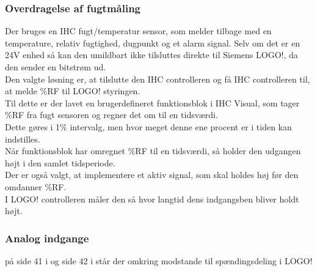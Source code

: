 \subsubsection{Overdragelse af fugtmåling}
Der bruges en IHC fugt/temperatur sensor, som melder tilbage med en temperature, relativ fugtighed, dugpunkt og et alarm signal.
Selv om det er en 24V enhed så kan den umildbart ikke tilsluttes direkte til Siemens LOGO!, da den sender en bitstrøm ud.\\
Den valgte løsning er, at tilslutte den IHC controlleren og få IHC controlleren til, at melde \%RF til LOGO! styringen. \\

Til dette er der lavet en brugerdefineret funktionsblok i IHC Visual, 
som tager \%RF fra fugt sensoren og regner det om til en tidsværdi. \\ 
Dette gøres i 1\% intervalg, men hvor meget denne ene procent er i tiden kan indstilles. \\
Når funktionsblok har omregnet \%RF til en tidsværdi, så holder den udgangen højt i den samlet tidsperiode. \\
Der er også valgt, at implementere et aktiv signal, som skal holdes høj før den omdanner \%RF.\\

I LOGO! controlleren måler den så hvor langtid dens indgangsben bliver holdt højt.



\subsubsection{Analog indgange}
på side 41 i \cite{logo_sm} og side 42 i \cite{logo_sm} står der omkring modstande til spændingsdeling i LOGO!
